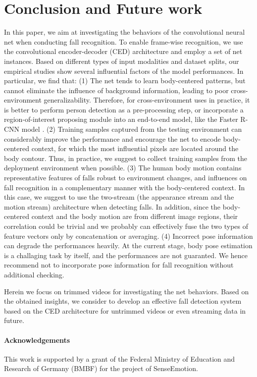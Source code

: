 \documentclass[runningheads]{llncs}
\begin{document}
\section{Conclusion and Future work}
\label{sec:conclusion}
In this paper, we aim at investigating the behaviors of the convolutional neural net when conducting fall recognition. To enable frame-wise recognition, we use the convolutional encoder-decoder (CED) architecture and employ a set of net instances. Based on different types of input modalities and dataset splits, our empirical studies show several influential factors of the model performances. In particular, we find that: (1) The net tends to learn body-centered patterns, but cannot eliminate the influence of background information, leading to poor cross-environment generalizability. Therefore, for cross-environment uses in practice, it is better to perform person detection as a pre-processing step, or incorporate a region-of-interest proposing module into an end-to-end model, like the Faster R-CNN model \cite{ren2015faster}.
(2) Training samples captured from the testing environment can considerably improve the performance and encourage the net to encode body-centered context, for which the most influential pixels are located around the body contour. Thus, in practice, we suggest to collect training samples from the deployment environment when possible. 
(3) The human body motion contains representative features of falls robust to environment changes, and influences on fall recognition in a complementary manner with the body-centered context. In this case, we suggest to use the two-stream (the appearance stream and the motion stream) architecture \cite{simonyan2014two} when detecting falls. In addition, since the body-centered context and the body motion are from different image regions, their correlation could be trivial and we probably can effectively fuse the two types of feature vectors only by concatenation or averaging. 
(4) Incorrect pose information can degrade the performances heavily. At the current stage, body pose estimation is a challaging task by itself, and the performances are not guaranted. We hence recommend not to incorporate pose information for fall recognition without additional checking. 


Herein we focus on trimmed videos for investigating the net behaviors. Based on the obtained insights, we consider to develop an effective fall detection system based on the CED architecture for untrimmed videos or even streaming data in future.



\paragraph{Acknowledgements}
This work is supported by a grant of the Federal Ministry of Education and Research of Germany (BMBF) for the project of SenseEmotion.



 
 
\end{document}
